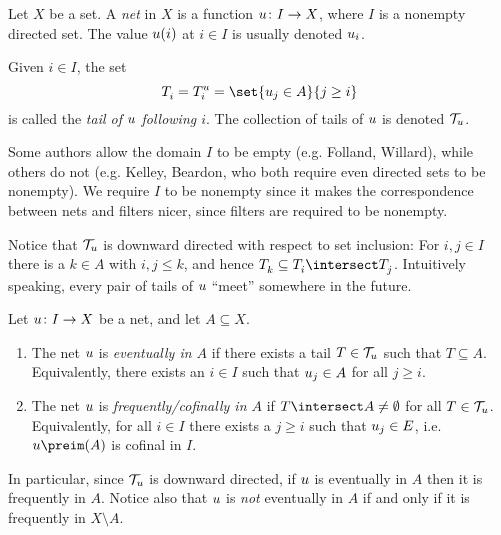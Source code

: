 \documentclass[article, a4paper, 11pt, oneside]{memoir}
\numberwithin{equation}{chapter}
\theoremstyle{nonumberplain}
\begin{document}
\begin{definition}[Nets]
    Let $X$ be a set. A \emph{net} in $X$ is a function $u \colon I \to X$, where $I$ is a nonempty directed set. The value $u(i)$ at $i \in I$ is usually denoted $u_i$.
    
    Given $i \in I$, the set
    \begin{equation*}
        \tail{i}
            = \tail[\mynet]{i}
            = \set{\mynet_j \in A}{j \geq i}
    \end{equation*}
    is called the \emph{tail of $u$ following $i$}. The collection of tails of $u$ is denoted $\mathcal{T}_{u}$.
\end{definition}
%
Some authors allow the domain $I$ to be empty (e.g. Folland, Willard), while others do not (e.g. Kelley, Beardon, who both require even directed sets to be nonempty). We require $I$ to be nonempty since it makes the correspondence between nets and filters nicer, since filters are required to be nonempty.

Notice that $\mathcal{T}_{u}$ is downward directed with respect to set inclusion: For $i, j \in I$ there is a $k \in A$ with $i, j \leq k$, and hence $\tail{k} \subseteq \tail{i} \intersect \tail{j}$. Intuitively speaking, every pair of tails of $u$ \enquote{meet} somewhere in the future.

\begin{definition}
    Let $u \colon I \to X$ be a net, and let $A \subseteq X$.
    \begin{enumerate}
        \item The net $u$ is \emph{eventually in $A$} if there exists a tail $T \in \mathcal{T}_{u}$ such that $T \subseteq A$. Equivalently, there exists an $i \in I$ such that $u_j \in A$ for all $j \geq i$.

        \item The net $u$ is \emph{frequently/cofinally in $A$} if $T \intersect A \neq \emptyset$ for all $T \in \mathcal{T}_{u}$. Equivalently, for all $i \in I$ there exists a $j \geq i$ such that $u_j \in E$, i.e. $\mynet\preim(A)$ is cofinal in $I$.
    \end{enumerate}
\end{definition}
%
In particular, since $\mathcal{T}_{u}$ is downward directed, if $u$ is eventually in $A$ then it is frequently in $A$. Notice also that $u$ is \emph{not} eventually in $A$ if and only if it is frequently in $X \setminus A$.
\end{document}
